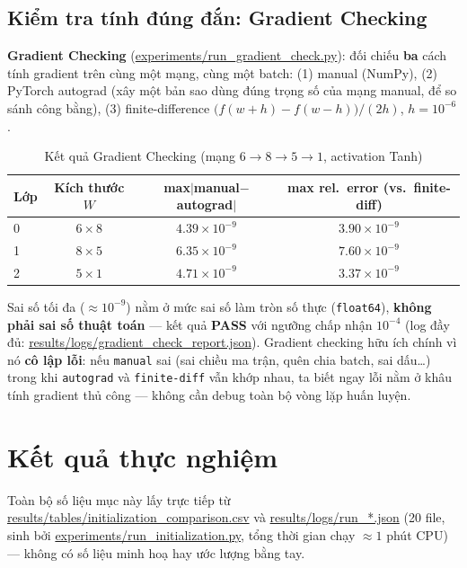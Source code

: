 \documentclass[12pt,a4paper]{article}
\begin{document}
\subsection{Kiểm tra tính đúng đắn: Gradient Checking}

\textbf{Gradient Checking} (\url{experiments/run_gradient_check.py}):
đối chiếu \textbf{ba} cách tính gradient trên cùng một mạng, cùng một
batch: (1) manual (NumPy), (2) PyTorch autograd (xây một bản sao dùng đúng
trọng số của mạng manual, để so sánh công bằng), (3) finite-difference
$\big(f(w+h)-f(w-h)\big)/(2h)$, $h=10^{-6}$.

\begin{table}[H]
\centering
\caption{Kết quả Gradient Checking (mạng $6\to8\to5\to1$, activation Tanh)}
\begin{tabular}{@{}lccc@{}}
\toprule
Lớp & Kích thước $W$ & max$|$manual$-$autograd$|$ & max rel.\ error (vs.\ finite-diff) \\
\midrule
0 & $6\times8$ & $4.39\times10^{-9}$ & $3.90\times10^{-9}$ \\
1 & $8\times5$ & $6.35\times10^{-9}$ & $7.60\times10^{-9}$ \\
2 & $5\times1$ & $4.71\times10^{-9}$ & $3.37\times10^{-9}$ \\
\bottomrule
\end{tabular}
\label{tab:gradcheck}
\end{table}
\label{sec:gradcheck}

Sai số tối đa ($\approx10^{-9}$) nằm ở mức sai số làm tròn số thực
(\texttt{float64}), \textbf{không phải sai số thuật toán} --- kết quả
\textbf{PASS} với ngưỡng chấp nhận $10^{-4}$ (log đầy đủ:
\url{results/logs/gradient_check_report.json}). Gradient checking hữu
ích chính vì nó \textbf{cô lập lỗi}: nếu \texttt{manual} sai (sai chiều ma
trận, quên chia batch, sai dấu\ldots) trong khi \texttt{autograd} và
\texttt{finite-diff} vẫn khớp nhau, ta biết ngay lỗi nằm ở khâu tính
gradient thủ công --- không cần debug toàn bộ vòng lặp huấn luyện.

\section{Kết quả thực nghiệm}
\label{sec:results}

Toàn bộ số liệu mục này lấy trực tiếp từ
\url{results/tables/initialization_comparison.csv} và
\url{results/logs/run_*.json} (20 file, sinh bởi
\url{experiments/run_initialization.py}, tổng thời gian chạy $\approx1$
phút CPU) --- không có số liệu minh hoạ hay ước lượng bằng tay.
\end{document}
